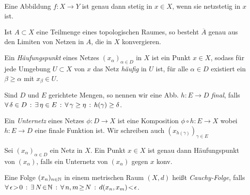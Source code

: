 \documentclass{cheat-sheet}
\begin{document}
\begin{prop}
  Eine Abbildung $f : X \to Y$ ist genau dann stetig in $x \in X$, wenn sie netzstetig in $x$ ist.
\end{prop}

\begin{prop}
  Ist $A \subset X$ eine Teilmenge eines topologischen Raumes, so besteht $\overline{A}$ genau aus den Limiten von Netzen in $A$, die in $X$ konvergieren.
\end{prop}

\begin{defn}
  Ein \emph{Häufungspunkt} eines Netzes $(x_\alpha)_{\alpha \in D}$ in $X$ ist ein Punkt $x \in X$, sodass für jede Umgebung $U \subset X$ von $x$ das Netz \emph{häufig} in $U$ ist, \dh{} für alle $\alpha \in D$ existiert ein $\beta \geq \alpha$ mit $x_\beta \in U$.
\end{defn}

\begin{defn}
  Sind $D$ und $E$ gerichtete Mengen, so nennen wir eine Abb. $h : E \to D$ \emph{final}, falls
  $\forall \, {\delta \in D} \,:\, \exists \, {\eta \in E} \,:\, \forall \, {\gamma \geq \eta} \,:\, h(\gamma) \geq \delta$.
\end{defn}

\begin{defn}
  Ein \emph{Unternetz} eines Netzes $\phi : D \to X$ ist eine Komposition $\phi \circ h : E \to X$ wobei $h : E \to D$ eine finale Funktion ist. Wir schreiben auch $(x_{h(\gamma)})_{\gamma \in E}$
\end{defn}


\begin{prop}
  Sei $(x_\alpha)_{\alpha \in D}$ ein Netz in $X$. Ein Punkt $x \in X$ ist genau dann Häufungspunkt von $(x_\alpha)$, falls ein Unternetz von $(x_\alpha)$ gegen $x$ konv.
\end{prop}


\begin{defn}
  Eine Folge $(x_n)_{n \in \mathbb{N}}$ in einem metrischen Raum $(X, d)$ heißt \emph{Cauchy-Folge}, falls
  $\fa{\epsilon \!>\! 0} \ex{N \!\in\! \N} \fa{n, m \!\geq\! N} d(x_n, x_m) \!<\! \epsilon$.
\end{defn}
\end{document}
